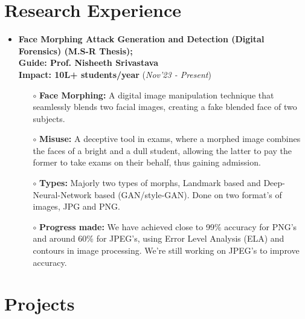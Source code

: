 \documentclass[10.8pt, a4paper]{extarticle}
\newcommand{\shorterSection}[1]{\vspace{-10pt}\section{#1}}
\begin{document}
\shorterSection{Research Experience}  
\vspace{2pt}
\begin{itemize}
\item \textbf{
Face Morphing Attack Generation and Detection (Digital Forensics) (M.S-R Thesis);  \\Guide: Prof. Nisheeth Srivastava} \\\textbf{Impact: 10L+ students/year}
\hfill\hfill(\textit{Nov'23 - Present})

\begin{itemize}  

          \item[$\circ$]\textbf{Face Morphing:} A digital image manipulation technique that seamlessly blends two facial images, creating a fake blended face of two subjects. \\[-0.6cm]
          \item[$\circ$]\textbf{Misuse:} A deceptive tool in exams, where a morphed image combines the faces of a bright and a dull student, allowing the latter to pay the former to take exams on their behalf, thus gaining admission.
          \item[$\circ$]\textbf{Types:} Majorly two types of morphs, Landmark based and Deep-Neural-Network based (GAN/style-GAN). Done on two format's of images, JPG and PNG.
          \item[$\circ$]\textbf{Progress made:} We have achieved close to 99\% accuracy for PNG's and around 60\% for JPEG's, using Error Level Analysis (ELA) and contours in image processing. We're still working on JPEG's to improve accuracy.
        
          
    \end{itemize}
\end{itemize}



\vspace{4pt}
\shorterSection{Projects}
\vspace{2pt}
\end{document}
